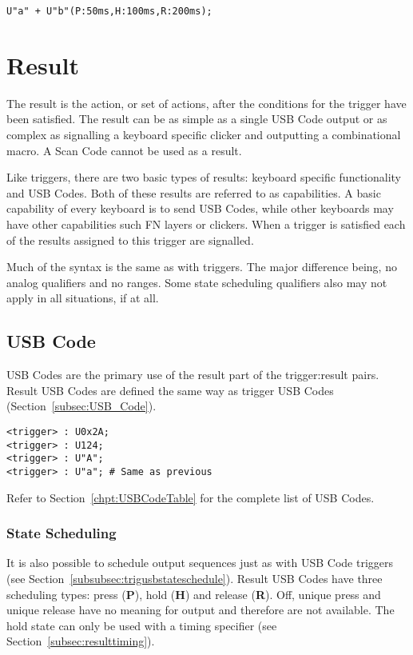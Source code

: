 \documentclass{kiibohd-template}
\begin{document}
\begin{lstlisting}
U"a" + U"b"(P:50ms,H:100ms,R:200ms);
\end{lstlisting}


\section{Result}

The result is the action, or set of actions, after the conditions for the trigger have been satisfied.
The result can be as simple as a single USB Code output or as complex as signalling a keyboard specific clicker and outputting a combinational macro.
A Scan Code cannot be used as a result.

Like triggers, there are two basic types of results: keyboard specific functionality and USB Codes.
Both of these results are referred to as capabilities.
A basic capability of every keyboard is to send USB Codes, while other keyboards may have other capabilities such FN layers or clickers.
When a trigger is satisfied each of the results assigned to this trigger are signalled.

Much of the syntax is the same as with triggers.
The major difference being, no analog qualifiers and no ranges.
Some state scheduling qualifiers also may not apply in all situations, if at all.


\subsection{USB Code}

USB Codes are the primary use of the result part of the trigger:result pairs.
Result USB Codes are defined the same way as trigger USB Codes (Section~\ref{subsec:USB_Code}).

\begin{lstlisting}
<trigger> : U0x2A;
<trigger> : U124;
<trigger> : U"A";
<trigger> : U"a"; # Same as previous
\end{lstlisting}

Refer to Section~\ref{chpt:USBCodeTable} for the complete list of USB Codes.


\subsubsection{State Scheduling}
\label{subsubsec:resultusbcodestateschedule}

It is also possible to schedule output sequences just as with USB Code triggers (see Section~\ref{subsubsec:trigusbstateschedule}).
Result USB Codes have three scheduling types: press (\textbf{P}), hold (\textbf{H}) and release (\textbf{R}).
Off, unique press and unique release have no meaning for output and therefore are not available.
The hold state can only be used with a timing specifier (see Section~\ref{subsec:resulttiming}).
\end{document}
